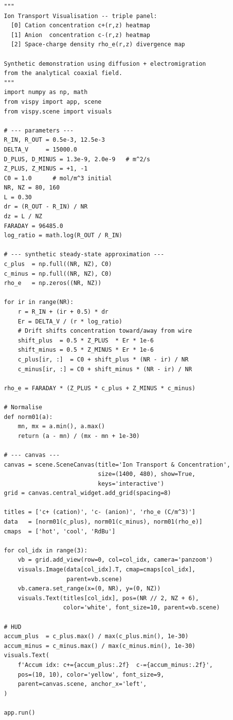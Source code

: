 \documentclass[11pt,a4paper]{article}
\begin{document}
\begin{lstlisting}[title={\textbf{Live VisPy ion concentration heatmap with flux overlay}}]
"""
Ion Transport Visualisation -- triple panel:
  [0] Cation concentration c+(r,z) heatmap
  [1] Anion  concentration c-(r,z) heatmap
  [2] Space-charge density rho_e(r,z) divergence map

Synthetic demonstration using diffusion + electromigration
from the analytical coaxial field.
"""
import numpy as np, math
from vispy import app, scene
from vispy.scene import visuals

# --- parameters ---
R_IN, R_OUT = 0.5e-3, 12.5e-3
DELTA_V     = 15000.0
D_PLUS, D_MINUS = 1.3e-9, 2.0e-9   # m^2/s
Z_PLUS, Z_MINUS = +1, -1
C0 = 1.0      # mol/m^3 initial
NR, NZ = 80, 160
L = 0.30
dr = (R_OUT - R_IN) / NR
dz = L / NZ
FARADAY = 96485.0
log_ratio = math.log(R_OUT / R_IN)

# --- synthetic steady-state approximation ---
c_plus  = np.full((NR, NZ), C0)
c_minus = np.full((NR, NZ), C0)
rho_e   = np.zeros((NR, NZ))

for ir in range(NR):
    r = R_IN + (ir + 0.5) * dr
    Er = DELTA_V / (r * log_ratio)
    # Drift shifts concentration toward/away from wire
    shift_plus  = 0.5 * Z_PLUS  * Er * 1e-6
    shift_minus = 0.5 * Z_MINUS * Er * 1e-6
    c_plus[ir, :]  = C0 + shift_plus * (NR - ir) / NR
    c_minus[ir, :] = C0 + shift_minus * (NR - ir) / NR

rho_e = FARADAY * (Z_PLUS * c_plus + Z_MINUS * c_minus)

# Normalise
def norm01(a):
    mn, mx = a.min(), a.max()
    return (a - mn) / (mx - mn + 1e-30)

# --- canvas ---
canvas = scene.SceneCanvas(title='Ion Transport & Concentration',
                           size=(1400, 480), show=True,
                           keys='interactive')
grid = canvas.central_widget.add_grid(spacing=8)

titles = ['c+ (cation)', 'c- (anion)', 'rho_e (C/m^3)']
data   = [norm01(c_plus), norm01(c_minus), norm01(rho_e)]
cmaps  = ['hot', 'cool', 'RdBu']

for col_idx in range(3):
    vb = grid.add_view(row=0, col=col_idx, camera='panzoom')
    visuals.Image(data[col_idx].T, cmap=cmaps[col_idx],
                  parent=vb.scene)
    vb.camera.set_range(x=(0, NR), y=(0, NZ))
    visuals.Text(titles[col_idx], pos=(NR // 2, NZ + 6),
                 color='white', font_size=10, parent=vb.scene)

# HUD
accum_plus  = c_plus.max() / max(c_plus.min(), 1e-30)
accum_minus = c_minus.max() / max(c_minus.min(), 1e-30)
visuals.Text(
    f'Accum idx: c+={accum_plus:.2f}  c-={accum_minus:.2f}',
    pos=(10, 10), color='yellow', font_size=9,
    parent=canvas.scene, anchor_x='left',
)

app.run()
\end{lstlisting}
\end{document}
